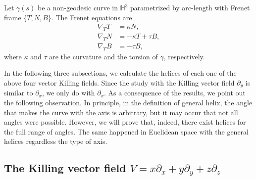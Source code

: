 \documentclass[a4paper,12pt]{amsart}
\theoremstyle{definition}
\def\h{\mathbb H}
\begin{document}
Let $\gamma(s)$ be a non-geodesic curve in $\h^3$ parametrized by arc-length with   Frenet frame   $\{T,N,B\}$. The Frenet equations are  
\begin{equation*}
\begin{split}
\nabla_TT&=\kappa N,\\
\nabla_TN&=-\kappa T+\tau B,\\
\nabla_TB&=-\tau B,
\end{split}
\end{equation*}
where $\kappa$ and $\tau$ are the curvature and the torsion  of $\gamma$, respectively. 

In the following three subsections, we calculate the helices of each one of the above four vector Killing fields. Since the study with the Killing vector field $\partial_y$ is similar to $\partial_x$, we only do with $\partial_x$. As a consequence of the results, we point out the following observation. In principle, in the definition of general helix, the angle that makes the curve with the axis is arbitrary, but it may occur that not all angles were possible. However, we will prove that, indeed, there exist helices for the full range of angles. The same   happened in Euclidean space with the general helices regardless the type of axis.

  \subsection{The Killing vector field $V=x\partial_x+y\partial_y+z\partial_z$}
  
\end{document}
